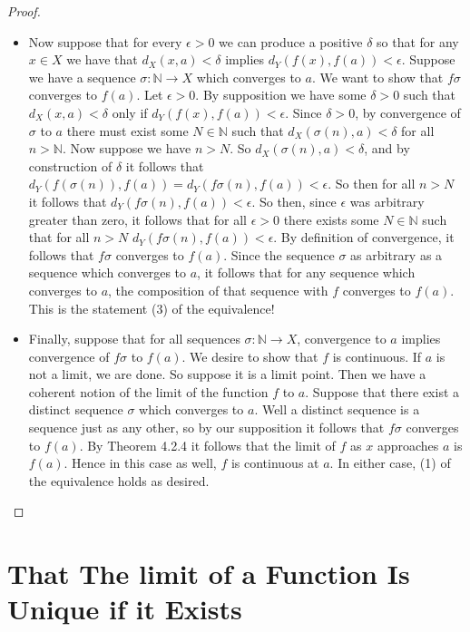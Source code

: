 \documentclass[11pt]{article}
\newcommand{\N}{\mathbb{N}}
\theoremstyle{definition}
\begin{document}
\begin{proof}
\begin{itemize}
\item Now suppose that for every $\epsilon > 0$ we can produce a positive $\delta$ so that for any $x\in X$ we have that $d_X(x,a) < \delta$ implies $d_Y(f(x) , f(a) ) < \epsilon$. Suppose we have a sequence $\sigma : \N \to X$ which converges to $a$. We want to show that $f\sigma$ converges to $f(a)$. Let $\epsilon > 0$. By supposition we have some $\delta > 0$ such that $d_X(x, a) < \delta$ only if $d_Y(f(x), f(a) ) < \epsilon$. Since $\delta > 0$, by convergence of $\sigma$ to $a$ there must exist some $N\in \N$ such that $d_X(\sigma(n) , a ) < \delta$ for all $n > \N$. Now suppose we have $n> N$. So $d_X(\sigma(n) , a ) < \delta$, and by construction of $\delta $ it follows that $d_Y(f(\sigma(n)), f(a) ) = d_Y(f\sigma(n), f(a) ) < \epsilon$. So then for all $n> N$ it follows that $ d_Y(f\sigma(n), f(a) ) < \epsilon $. So then, since $\epsilon$ was arbitrary greater than zero, it follows that for all $\epsilon > 0$ there exists some $N\in \N$ such that for all $n > N$ $d_Y(f\sigma(n) , f(a) ) < \epsilon$. By definition of convergence, it follows that $f\sigma$ converges to $f(a)$. Since the sequence $\sigma$ as arbitrary as a sequence which converges to $a$, it follows that for any sequence which converges to $a$, the composition of that sequence with $f$ converges to $f(a)$. This is the statement (3) of the equivalence!
\item Finally, suppose that for all sequences $\sigma:\N \to X$, convergence to $a$ implies convergence of $f\sigma$ to $f(a)$. We desire to show that $f$ is continuous. If $a$ is not a limit, we are done. So suppose it is a limit point. Then we have a coherent notion of the limit of the function $f$ to $a$. Suppose that there exist a distinct sequence $\sigma$ which converges to $a$. Well a distinct sequence is a sequence just as any other, so by our supposition it follows that $f\sigma$ converges to $f(a)$. By Theorem 4.2.4 it follows that the limit of $f$ as $x$ approaches $a$ is $f(a)$. Hence in this case as well, $f$ is continuous at $a$. In either case, (1) of the equivalence holds as desired.
\end{itemize}

\end{proof}

\section{That The limit of a Function Is Unique if it Exists}
\end{document}
